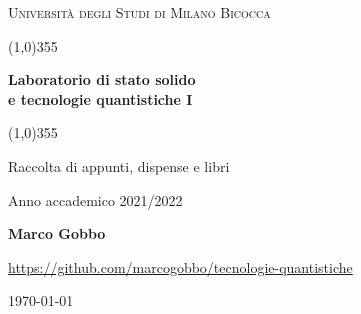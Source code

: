 \documentclass[a4paper, 12pt]{book}
\begin{document}
    \begin{titlepage}
        \begin{center}
            \vspace*{5cm}
            {\scshape\LARGE Università degli Studi di Milano Bicocca \par}
            \vspace{1.0cm}
            \line(1,0){355} \\
            {\huge\bfseries Laboratorio di stato solido \\ e tecnologie quantistiche I \par}
            \line(1,0){355} \\
 	        \vspace{0.5cm}
            {\Large Raccolta di appunti, dispense e libri \par}
            \vspace{1.0cm}
            {Anno accademico 2021/2022 \par}
            \vspace{0.5cm}
            {\bfseries Marco Gobbo \par}
            \vspace{0.5cm}
            {\url{https://github.com/marcogobbo/tecnologie-quantistiche} \par}
            \vspace*{\fill}
            {\large \today \par}
        \end{center}
    \end{titlepage}
    \tableofcontents
    
\end{document}
